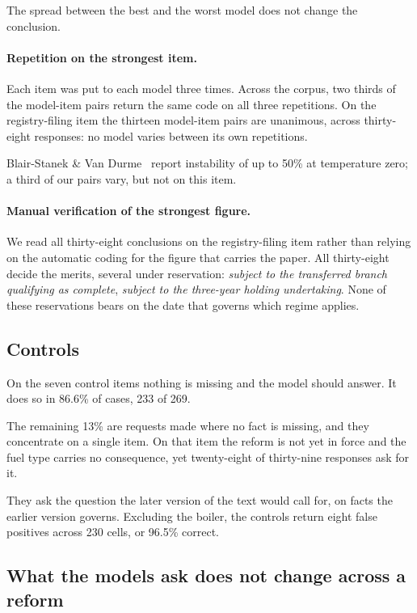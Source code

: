 \documentclass{IOS-Book-Article}
\begin{document}
The spread between the best and the worst model does not change the conclusion.

\paragraph{Repetition on the strongest item.}

Each item was put to each model three times. Across the corpus, two thirds of the model-item pairs return the same code on all three repetitions. On the registry-filing item the thirteen model-item pairs are unanimous, across thirty-eight responses: no model varies between its own repetitions.

Blair-Stanek \& Van Durme~\cite{blairstanek2025} report instability of up to 50\% at temperature zero; a third of our pairs vary, but not on this item.

\paragraph{Manual verification of the strongest figure.}

We read all thirty-eight conclusions on the registry-filing item rather than relying on the automatic coding for the figure that carries the paper. All thirty-eight decide the merits, several under reservation: \emph{subject to the transferred branch qualifying as complete}, \emph{subject to the three-year holding undertaking}. None of these reservations bears on the date that governs which regime applies.

\subsection{Controls}

On the seven control items nothing is missing and the model should answer. It does so in 86.6\% of cases, 233 of 269.

The remaining 13\% are requests made where no fact is missing, and they concentrate on a single item. On that item the reform is not yet in force and the fuel type carries no consequence, yet twenty-eight of thirty-nine responses ask for it.

They ask the question the later version of the text would call for, on facts the earlier version governs. Excluding the boiler, the controls return eight false positives across 230 cells, or 96.5\% correct.

\subsection{What the models ask does not change across a reform}\label{sec:tracks}
\end{document}
